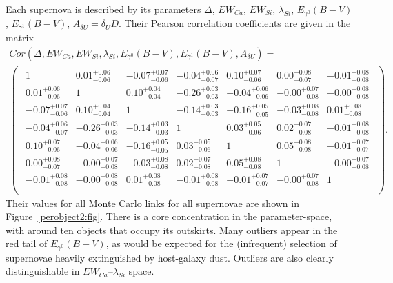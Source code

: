 \documentclass{aastex61}   	%
\begin{document}
Each supernova is described by its parameters
 $\Delta$, $EW_{Ca}$, $EW_{Si}$, $\lambda_{Si}$, $E_{\gamma^0}(B-V)$, $E_{\gamma^1}(B-V)$,  $A_{\delta U}=\delta_U D$.
 Their Pearson correlation coefficients are given in the matrix
\begin{multline}
Cor(\Delta, EW_{Ca}, EW_{Si}, \lambda_{Si}, E_{\gamma^0}(B-V), E_{\gamma^1}(B-V),  A_{\delta U}) =\\
\begin{pmatrix}
\begin{array}{rrrrrrr}
1 & 0.01^{+0.06}_{-0.06} & -0.07^{+0.07}_{-0.06} & -0.04^{+0.06}_{-0.07} & 0.10^{+0.07}_{-0.06} & 0.00^{+0.08}_{-0.07} & -0.01^{+0.08}_{-0.08} \\
0.01^{+0.06}_{-0.06} & 1 & 0.10^{+0.04}_{-0.04} & -0.26^{+0.03}_{-0.03} & -0.04^{+0.06}_{-0.06} & -0.00^{+0.07}_{-0.08} & -0.00^{+0.08}_{-0.08} \\
-0.07^{+0.07}_{-0.06} & 0.10^{+0.04}_{-0.04} & 1 & -0.14^{+0.03}_{-0.03} & -0.16^{+0.05}_{-0.05} & -0.03^{+0.08}_{-0.08} & 0.01^{+0.08}_{-0.08} \\
-0.04^{+0.06}_{-0.07} & -0.26^{+0.03}_{-0.03} & -0.14^{+0.03}_{-0.03} & 1 & 0.03^{+0.05}_{-0.06} & 0.02^{+0.07}_{-0.08} & -0.01^{+0.08}_{-0.08} \\
0.10^{+0.07}_{-0.06} & -0.04^{+0.06}_{-0.06} & -0.16^{+0.05}_{-0.05} & 0.03^{+0.05}_{-0.06} & 1 & 0.05^{+0.08}_{-0.08} & -0.01^{+0.07}_{-0.07} \\
0.00^{+0.08}_{-0.07} & -0.00^{+0.07}_{-0.08} & -0.03^{+0.08}_{-0.08} & 0.02^{+0.07}_{-0.08} & 0.05^{+0.08}_{-0.08} & 1 & -0.00^{+0.07}_{-0.08} \\
-0.01^{+0.08}_{-0.08} & -0.00^{+0.08}_{-0.08} & 0.01^{+0.08}_{-0.08} & -0.01^{+0.08}_{-0.08} & -0.01^{+0.07}_{-0.07} & -0.00^{+0.07}_{-0.08} & 1 \\
\end{array}
\end{pmatrix}.
\end{multline}
Their values for all Monte Carlo links for all supernovae are shown in Figure~\ref{perobject2:fig}.
There is a core concentration in the  parameter-space, with around ten objects that occupy its outskirts.
Many outliers appear in the red tail of $E_{\gamma^0}(B-V)$, as would be expected for the (infrequent) selection of supernovae
heavily extinguished by host-galaxy dust.
Outliers  are also clearly distinguishable in  $EW_{Ca}$--$\lambda_{Si}$ space.   

\end{document}
